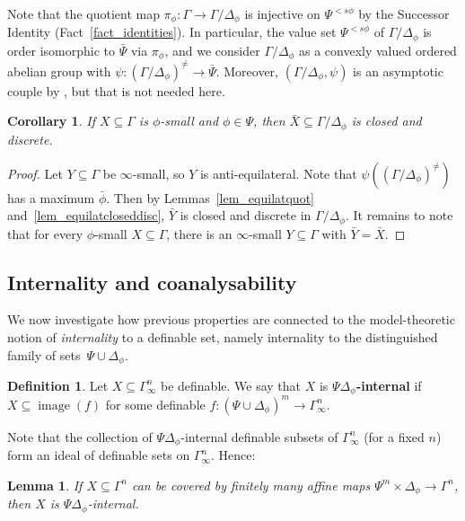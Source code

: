 \documentclass[11pt]{amsart}
\theoremstyle{plain}
\newtheorem{lemma}[thm]{Lemma}
\newtheorem{cor}[thm]{Corollary}
\theoremstyle{definition}
\newtheorem*{def*}{Definition}
\numberwithin{equation}{section}
\newcommand\0{\varnothing}
\DeclareMathOperator\image{image}
\begin{document}
\noindent
Note that the quotient map $\pi_{\phi}\colon\Gamma \to \Gamma/\Delta_{\phi}$ is injective on $\Psi^{<s\phi}$ by the Successor Identity (Fact~\ref{fact_identities}).
In particular, the value set $\Psi^{<s\phi}$ of $\Gamma/\Delta_{\phi}$ is order isomorphic to $\bar{\Psi}$ via $\pi_\phi$, and we consider $\Gamma/\Delta_{\phi}$ as a convexly valued ordered abelian group with $\psi \colon (\Gamma/\Delta_{\phi})^{\neq} \to \bar{\Psi}$. 
Moreover, $(\Gamma/\Delta_{\phi}, \psi)$ is an asymptotic couple by \cite[Lemma~9.2.24]{ADAMTT}, but that is not needed here.
\begin{cor}\label{cor_dphibarcloseddisc}
If $X\subseteq\Gamma$ is $\phi$-small and $\phi\in\Psi$, then $\bar{X}\subseteq\Gamma/\Delta_{\phi}$ is closed and discrete. \end{cor}
\begin{proof}
Let $Y\subseteq \Gamma$ be $\infty$-small, so $Y$ is anti-equilateral. Note that $\psi((\Gamma/\Delta_{\phi})^{\neq})$ has a maximum $\bar{\phi}$.
Then by Lemmas~\ref{lem_equilatquot} and~\ref{lem_equilatcloseddisc}, $\bar{Y}$ is closed and discrete in $\Gamma/\Delta_{\phi}$.
It remains to note that for every $\phi$-small $X \subseteq\Gamma$, there is an $\infty$-small $Y\subseteq\Gamma$ with $\bar{Y}=\bar{X}$.
\end{proof}



\subsection{Internality and coanalysability}\label{interality_coanalysability_subsection}
We now investigate how previous properties are connected to the model-theoretic notion of \emph{internality} to a definable set, namely internality to the distinguished family of sets~$\Psi\cup\Delta_{\phi}$. 


\begin{def*}
Let $X \subseteq \Gamma^{n}_{\infty}$ be definable.
We say that $X$ is \textbf{$\Psi\Delta_{\phi}$-internal} if $X \subseteq \image(f)$ for some definable $f \colon (\Psi\cup\Delta_{\phi})^m \to \Gamma^n_{\infty}$.
\end{def*}


\noindent
Note that the collection of $\Psi\Delta_{\phi}$-internal definable subsets of $\Gamma^n_{\infty}$ (for a fixed $n$) form an ideal of definable sets on $\Gamma^n_{\infty}$.
Hence:
\begin{lemma}\label{lem_dsetPsiint}
If $X\subseteq\Gamma^n$ can be covered by finitely many affine maps $\Psi^m\times\Delta_{\phi}\to\Gamma^n$, then $X$ is $\Psi\Delta_{\phi}$-internal.
\end{lemma}
\end{document}
